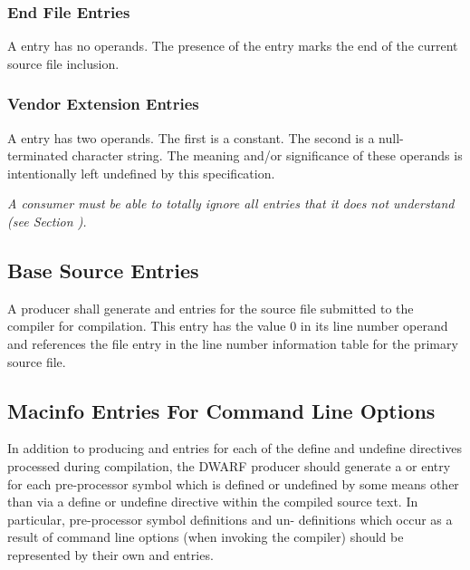 \subsubsection{End File Entries}
\label{chap:endfileentries}
A \DWMACINFOendfileTARG{} entry has no operands. The presence of
the entry marks the end of the current source file inclusion.

\subsubsection{Vendor Extension Entries}
\label{chap:vendorextensionentries}
A \DWMACINFOvendorextTARG{} entry has two operands. The first
is a constant. The second is a null-terminated character
string. The meaning and/or significance of these operands is
intentionally left undefined by this specification.

\textit{A consumer must be able to totally ignore all
\DWMACINFOvendorext{} entries that it does not understand
(see Section ).}


\subsection{Base Source Entries} 
\label{chap:basesourceentries}

A producer shall generate \DWMACINFOstartfile{} and
\DWMACINFOendfile{} entries for the source file submitted to
the compiler for compilation. This \DWMACINFOstartfile{} entry
has the value 0 in its line number operand and references
the file entry in the line number information table for the
primary source file.


\subsection{Macinfo Entries For Command Line Options}
\label{chap:macinfoentriesforcommandlineoptions}

In addition to producing \DWMACINFOdefine{} and \DWMACINFOundef{}
entries for each of the define and undefine directives
processed during compilation, the DWARF producer should
generate a \DWMACINFOdefine{} or \DWMACINFOundef{} entry for
each pre-processor symbol which is defined or undefined by
some means other than via a define or undefine directive
within the compiled source text. In particular, pre-processor
symbol definitions and un- definitions which occur as a
result of command line options (when invoking the compiler)
should be represented by their own \DWMACINFOdefine{} and
\DWMACINFOundef{} entries.

